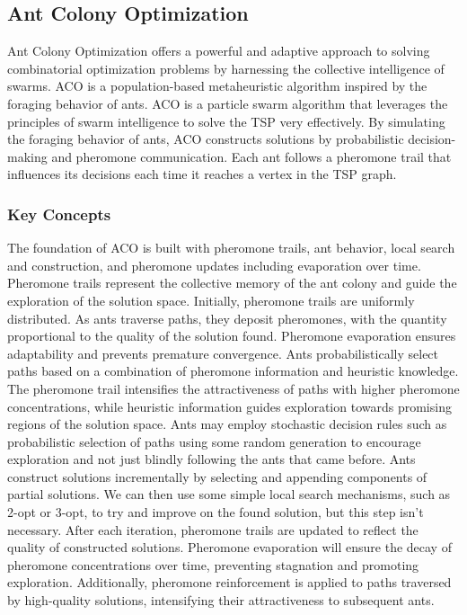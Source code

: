 \documentclass{article}
\begin{document}
\subsection{Ant Colony Optimization}
Ant Colony Optimization offers a powerful and adaptive approach to solving combinatorial optimization problems by harnessing the collective intelligence of swarms. ACO is a population-based metaheuristic algorithm inspired by the foraging behavior of ants. ACO is a particle swarm algorithm that leverages the principles of swarm intelligence to solve the TSP very effectively. By simulating the foraging behavior of ants, ACO constructs solutions by probabilistic decision-making and pheromone communication. Each ant follows a pheromone trail that influences its decisions each time it reaches a vertex in the TSP graph.

\subsubsection{Key Concepts}
The foundation of ACO is built with pheromone trails, ant behavior, local search and construction, and pheromone updates including evaporation over time. Pheromone trails represent the collective memory of the ant colony and guide the exploration of the solution space. Initially, pheromone trails are uniformly distributed. As ants traverse paths, they deposit pheromones, with the quantity proportional to the quality of the solution found. Pheromone evaporation ensures adaptability and prevents premature convergence. Ants probabilistically select paths based on a combination of pheromone information and heuristic knowledge. The pheromone trail intensifies the attractiveness of paths with higher pheromone concentrations, while heuristic information guides exploration towards promising regions of the solution space. Ants may employ stochastic decision rules such as probabilistic selection of paths using some random generation to encourage exploration and not just blindly following the ants that came before. Ants construct solutions incrementally by selecting and appending components of partial solutions. We can then use some simple local search mechanisms, such as 2-opt or 3-opt, to try and improve on the found solution, but this step isn't necessary. After each iteration, pheromone trails are updated to reflect the quality of constructed solutions. Pheromone evaporation will ensure the decay of pheromone concentrations over time, preventing stagnation and promoting exploration. Additionally, pheromone reinforcement is applied to paths traversed by high-quality solutions, intensifying their attractiveness to subsequent ants.
\end{document}
